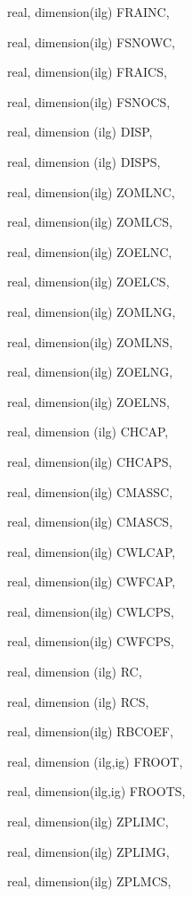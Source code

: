 {\begin{DoxyParamCaption}
\item[{real, dimension(ilg)}]{F\+R\+A\+I\+N\+C, }
\item[{real, dimension(ilg)}]{F\+S\+N\+O\+W\+C, }
\item[{real, dimension(ilg)}]{F\+R\+A\+I\+C\+S, }
\item[{real, dimension(ilg)}]{F\+S\+N\+O\+C\+S, }
\item[{real, dimension  (ilg)}]{D\+I\+S\+P, }
\item[{real, dimension (ilg)}]{D\+I\+S\+P\+S, }
\item[{real, dimension(ilg)}]{Z\+O\+M\+L\+N\+C, }
\item[{real, dimension(ilg)}]{Z\+O\+M\+L\+C\+S, }
\item[{real, dimension(ilg)}]{Z\+O\+E\+L\+N\+C, }
\item[{real, dimension(ilg)}]{Z\+O\+E\+L\+C\+S, }
\item[{real, dimension(ilg)}]{Z\+O\+M\+L\+N\+G, }
\item[{real, dimension(ilg)}]{Z\+O\+M\+L\+N\+S, }
\item[{real, dimension(ilg)}]{Z\+O\+E\+L\+N\+G, }
\item[{real, dimension(ilg)}]{Z\+O\+E\+L\+N\+S, }
\item[{real, dimension (ilg)}]{C\+H\+C\+A\+P, }
\item[{real, dimension(ilg)}]{C\+H\+C\+A\+P\+S, }
\item[{real, dimension(ilg)}]{C\+M\+A\+S\+S\+C, }
\item[{real, dimension(ilg)}]{C\+M\+A\+S\+C\+S, }
\item[{real, dimension(ilg)}]{C\+W\+L\+C\+A\+P, }
\item[{real, dimension(ilg)}]{C\+W\+F\+C\+A\+P, }
\item[{real, dimension(ilg)}]{C\+W\+L\+C\+P\+S, }
\item[{real, dimension(ilg)}]{C\+W\+F\+C\+P\+S, }
\item[{real, dimension    (ilg)}]{R\+C, }
\item[{real, dimension   (ilg)}]{R\+C\+S, }
\item[{real, dimension(ilg)}]{R\+B\+C\+O\+E\+F, }
\item[{real, dimension (ilg,ig)}]{F\+R\+O\+O\+T, }
\item[{real, dimension(ilg,ig)}]{F\+R\+O\+O\+T\+S, }
\item[{real, dimension(ilg)}]{Z\+P\+L\+I\+M\+C, }
\item[{real, dimension(ilg)}]{Z\+P\+L\+I\+M\+G, }
\item[{real, dimension(ilg)}]{Z\+P\+L\+M\+C\+S, }

\end{DoxyParamCaption}}
